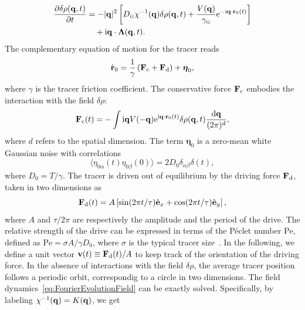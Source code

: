 \documentclass[pre, superscriptaddress, twocolumn,pre]{revtex4-1}
\newcommand{\dd}{\text{d}}
\newcommand{\ee}{\text{e}}
\newcommand{\ii}{\text{i}}
\begin{document}
\begin{equation}\label{eq:FourierEvolutionField}
	\begin{aligned}
		\frac{\partial \delta \rho({\bf q},t)}{\partial t} &= - |{\bf q}|^2 \left[ D_\text{\tiny G} \chi^{-1}({\bf q}) \delta \rho({\bf q},t) + \frac{V({\bf q})}{\gamma_\text{\tiny G}} \ee^{-\ii {\bf q} \cdot {\bf r}_0(t)} \right]
		\\
		&\quad + \ii{\bf q}\cdot{\boldsymbol\Lambda} ({\bf q},t) .
	\end{aligned}
\end{equation}
The complementary equation of motion for the tracer reads
\begin{equation}\label{eq:EvolutionTracer}
	\dot{\bf r}_0 = \frac{1}{\gamma} \left( {\bf F}_\text{c}+{\bf F}_\text{d} \right) + {\boldsymbol\eta_0} ,
\end{equation}
where $\gamma$ is the tracer friction coefficient. The conservative force ${\bf F}_\text{c}$ embodies the interaction with the field $\delta\rho$:
\begin{equation}
	{\bf F}_\text{c}(t) = - \int \ii{\bf q} V(-{\bf q})\ee^{\ii{\bf q} \cdot {\bf r}_0(t)} \delta \rho({\bf q}, t) \frac{\dd{\bf q}}{(2\pi)^d} ,
\end{equation}
where $d$ refers to the spatial dimension. The term ${\boldsymbol\eta}_0$ is a zero-mean white Gaussian noise with correlations
\begin{equation}
	\langle\eta_{0\alpha}(t)\eta_{0\beta}(0)\rangle = 2 D_0 \delta_{\alpha\beta}\delta(t) ,
\end{equation}
where $D_0 = T/\gamma$. The tracer is driven out of equilibrium by the driving force ${\bf F}_\text{d}$, taken in two dimensions as
\begin{equation}\label{eq:theta}
	{\bf F}_{\rm d}(t) = A \left[\sin(2\pi t/\tau) \hat{\bf e}_x + \cos(2\pi t/\tau)\hat{\bf e}_y \right] ,
\end{equation}
where $A$ and $\tau/2\pi$ are respectively the amplitude and the period of the drive. The relative strength of the drive can be expressed in terms of the P\'eclet number $\text{Pe}$, defined as $\text{Pe} = \sigma A/\gamma D_0$, where $\sigma$ is the typical tracer size~\cite{Han2016, delJunco2018}. In the following, we define a unit vector ${\bf v}(t) \equiv {\bf F}_{\rm d}(t)/A$ to keep track of the orientation of the driving force. In the absence of interactions with the field $\delta\rho$, the average tracer position follows a periodic orbit, correspondig to a circle in two dimensions. The field dynamics~\eqref{eq:FourierEvolutionField} can be exactly solved. Specifically, by labeling $\chi^{-1}({\bf q}) = K({\bf q})$, we get
\end{document}

